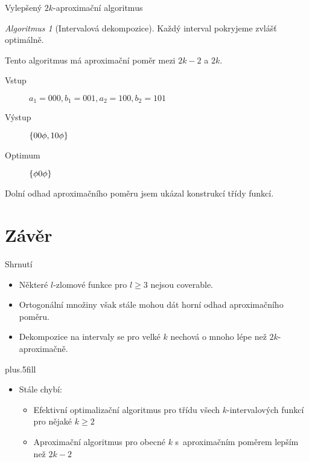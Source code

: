 \documentclass{beamer}
\theoremstyle{remark}
\newtheorem{algorithm}{Algoritmus}
\begin{document}
\begin{frame}{Vylepšený $2k$-aproximační algoritmus}
\begin{algorithm}[Intervalová dekompozice]
Každý interval pokryjeme zvlášť optimálně.
\end{algorithm}

Tento algoritmus má aproximační poměr mezi $2k-2$ a $2k$.

\begin{example}
\begin{description}
\item[Vstup]
$a_1 = 000, b_1 = 001, a_2 = 100, b_2 = 101$

\item[Výstup]
$\{00 \phi, 10 \phi\}$

\item[Optimum]
$\{\phi 0 \phi\}$
\end{description}
\end{example}

Dolní odhad aproximačního poměru jsem ukázal konstrukcí třídy  funkcí.
\end{frame}

\section{Závěr}

\begin{frame}{Shrnutí}

  \begin{itemize}
  \item
    Některé $l$-zlomové funkce pro $l \geq 3$ nejsou coverable.
  \item
    Ortogonální množiny však stále mohou dát horní odhad aproximačního poměru.
  \item
    Dekompozice na intervaly se pro velké $k$ nechová o mnoho lépe než $2k$-aproximačně.
  \end{itemize}
  
  \vskip0pt plus.5fill
  \begin{itemize}
  \item
    Stále chybí:
    \begin{itemize}
    \item
      Efektivní optimalizační algoritmus pro třídu všech $k$-intervalových funkcí pro nějaké $k \geq 2$
    \item
      Aproximační algoritmus pro obecné $k$ s~aproximačním poměrem lepším než $2k-2$
    \end{itemize}
  \end{itemize}
\end{frame}
\end{document}
